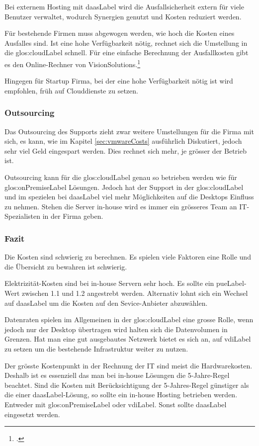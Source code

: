 Bei externem Hosting mit \Gls{daasLabel} wird die Ausfallsicherheit extern für viele Benutzer verwaltet, wodurch Synergien genutzt und Kosten reduziert werden.

Für bestehende Firmen muss abgewogen werden, wie hoch die Kosten eines Ausfalles sind. Ist eine hohe Verfügbarkeit nötig, rechnet sich die Umstellung in die \Gls{glos:cloudLabel} schnell. Für eine einfache Berechnung der Ausfallkosten gibt es den Online-Rechner von VisionSolutions.\footcite{Disaster_Recovery_Resouce_Center_-_Vision_Solutions}

Hingegen für Startup Firma, bei der eine hohe Verfügbarkeit nötig ist wird empfohlen, früh auf Clouddienste zu setzen.

\subsubsection{Outsourcing}
Das Outsourcing des Supports zieht zwar weitere Umstellungen für die Firma mit sich, es kann, wie im Kapitel \cref{sec:vmwareCosts} ausführlich Diskutiert, jedoch sehr viel Geld eingespart werden. Dies rechnet sich mehr, je grösser der Betrieb ist.

Outsourcing kann für die \Gls{glos:cloudLabel} genau so betrieben werden wie für \gls{glos:onPremiseLabel} Lösungen. Jedoch hat der Support in der \Gls{glos:cloudLabel} und im spezielen bei \Gls{daasLabel} viel mehr Möglichkeiten auf die Desktops Einfluss zu nehmen. Stehen die Server in-house wird es immer ein grösseres Team an IT-Spezialisten in der Firma geben.

\subsubsection{Fazit}
Die Kosten sind schwierig zu berechnen. Es spielen viele Faktoren eine Rolle und die Übersicht zu bewahren ist schwierig.

Elektrizität-Kosten sind bei in-house Servern sehr hoch. Es sollte ein \Gls{pueLabel}-Wert zwischen 1.1 und 1.2 angestrebt werden. Alternativ lohnt sich ein Wechsel auf \Gls{daasLabel} um die Kosten auf den Sevice-Anbieter abzuwählen.

Datenraten spielen im Allgemeinen in der \Gls{glos:cloudLabel} eine grosse Rolle, wenn jedoch nur der Desktop übertragen wird halten sich die Datenvolumen in Grenzen. Hat man eine gut ausgebautes Netzwerk bietet es sich an, auf \Gls{vdiLabel} zu setzen um die bestehende Infrastruktur weiter zu nutzen.

Der grösste Kostenpunkt in der Rechnung der IT sind meist die Hardwarekosten. Deshalb ist es essenziell das man bei in-house Lösungen die 5-Jahre-Regel beachtet. Sind die Kosten mit Berücksichtigung der 5-Jahres-Regel günstiger als die einer \Gls{daasLabel}-Lösung, so sollte ein in-house Hosting betrieben werden. Entweder mit \gls{glos:onPremiseLabel} oder \Gls{vdiLabel}. Sonst sollte \Gls{daasLabel} eingesetzt werden.

